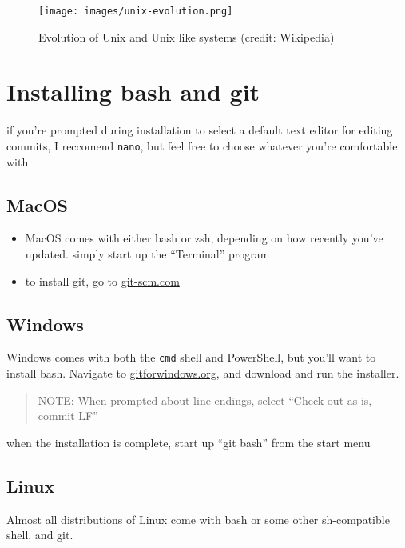 \documentclass[
]{article}
\providecommand{\tightlist}{%
  \setlength{\itemsep}{0pt}\setlength{\parskip}{0pt}}
\begin{document}
\begin{figure}
\centering
\texttt{[image: images/unix-evolution.png]}
\caption{Evolution of Unix and Unix like systems (credit: Wikipedia)}
\end{figure}

\hypertarget{installing-bash-and-git}{%
\section{Installing bash and git}\label{installing-bash-and-git}}

if you're prompted during installation to select a default text editor
for editing commits, I reccomend \texttt{nano}, but feel free to choose
whatever you're comfortable with

\hypertarget{macos}{%
\subsection{MacOS}\label{macos}}

\begin{itemize}
\tightlist
\item
  MacOS comes with either bash or zsh, depending on how recently you've
  updated. simply start up the ``Terminal'' program
\item
  to install git, go to \href{https://git-scm.com}{git-scm.com}
\end{itemize}

\hypertarget{windows}{%
\subsection{Windows}\label{windows}}

Windows comes with both the \texttt{cmd} shell and PowerShell, but
you'll want to install bash. Navigate to
\href{https://gitforwindows.org}{gitforwindows.org}, and download and
run the installer.

\begin{quote}
NOTE: When prompted about line endings, select ``Check out as-is, commit
LF''
\end{quote}

when the installation is complete, start up ``git bash'' from the start
menu

\hypertarget{linux}{%
\subsection{Linux}\label{linux}}

Almost all distributions of Linux come with bash or some other
sh-compatible shell, and git.
\end{document}
